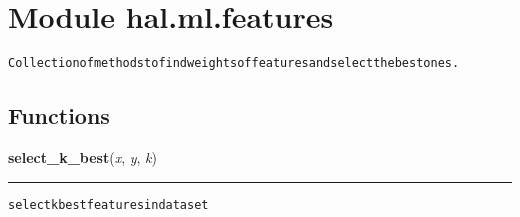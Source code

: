 %
%
%


\section{Module hal.ml.features}

    \label{hal:ml:features}
\begin{alltt}
Collection of methods to find weights of features and select the best ones. 
\end{alltt}



  \subsection{Functions}

    \label{hal:ml:features:select_k_best}

    \vspace{0.5ex}

\hspace{.8\funcindent}\begin{boxedminipage}{\funcwidth}

    \raggedright \textbf{select\_k\_best}(\textit{x}, \textit{y}, \textit{k})

    \vspace{-1.5ex}

    \rule{\textwidth}{0.5\fboxrule}
\setlength{\parskip}{2ex}
\begin{alltt}
select k best features in dataset 
\end{alltt}

\setlength{\parskip}{1ex}
    \end{boxedminipage}

